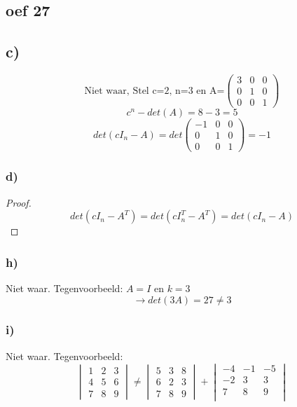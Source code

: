\documentclass[10pt,a4paper]{article}
\begin{document}
\subsection*{oef 27}
\subsection*{c)}
\[ \text{Niet waar, Stel c=2, n=3 en A=}
\begin{pmatrix}
3 & 0 & 0\\
0 & 1 & 0\\
0 & 0 & 1
\end{pmatrix} 
\]
\[c^{n}-det(A) = 8 - 3 = 5\]
\[ det (cI_{n}-A) = det
\begin{pmatrix}
-1 & 0 & 0 \\
0 & 1 & 0\\
0 & 0 & 1
\end{pmatrix}
= -1\]

\subsubsection*{d)}
\begin{proof}
\[
det(cI_n - A^T) = det(cI_n^T - A^T) = det(cI_n - A)
\]
\end{proof}

\subsubsection*{h)}
Niet waar. Tegenvoorbeeld: $A=I$ en $k=3$
\[
\rightarrow det(3A) = 27 \neq 3
\]
\subsubsection*{i)}
Niet waar. Tegenvoorbeeld: 
\[
    \begin{vmatrix}
        1 & 2 & 3\\
        4 & 5 & 6\\
        7 & 8 & 9
    \end{vmatrix} \neq
    \begin{vmatrix}
        5 & 3 & 8\\
        6 & 2 & 3\\
        7 & 8 & 9
    \end{vmatrix} + 
    \begin{vmatrix}
        -4 & -1 & -5\\
        -2 & 3 & 3\\
        7 & 8 & 9\\
    \end{vmatrix}
\]
\end{document}
